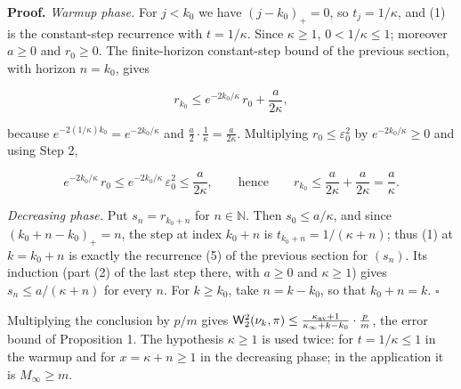 \documentclass[11pt,a4paper]{report}
\begin{document}
\textbf{Proof.} \emph{Warmup phase.} For \(j<k_0\) we have \((j-k_0)_+=0\), so \(t_j=1/\kappa\), and (1) is the constant-step recurrence with \(t=1/\kappa\). Since \(\kappa\ge1\), \(0<1/\kappa\le1\); moreover \(a\ge0\) and \(r_0\ge0\). The finite-horizon constant-step bound of the previous section, with horizon \(n=k_0\), gives


\[r_{k_0}\le e^{-2k_0/\kappa}\,r_0+\frac a{2\kappa},\]


because \(e^{-2(1/\kappa)k_0}=e^{-2k_0/\kappa}\) and \(\frac a2\cdot\frac1\kappa=\frac a{2\kappa}\). Multiplying \(r_0\le\varepsilon_0^2\) by \(e^{-2k_0/\kappa}\ge0\) and using Step 2,


\[e^{-2k_0/\kappa}\,r_0\le e^{-2k_0/\kappa}\,\varepsilon_0^2\le\frac a{2\kappa},\qquad\text{hence}\qquad r_{k_0}\le\frac a{2\kappa}+\frac a{2\kappa}=\frac a\kappa.\]


\emph{Decreasing phase.} Put \(s_n=r_{k_0+n}\) for \(n\in\mathbb N\). Then \(s_0\le a/\kappa\), and since \((k_0+n-k_0)_+=n\), the step at index \(k_0+n\) is \(t_{k_0+n}=1/(\kappa+n)\); thus (1) at \(k=k_0+n\) is exactly the recurrence (5) of the previous section for \((s_n)\). Its induction (part (2) of the last step there, with \(a\ge0\) and \(\kappa\ge1\)) gives \(s_n\le a/(\kappa+n)\) for every \(n\). For \(k\ge k_0\), take \(n=k-k_0\), so that \(k_0+n=k\). \(\square\)




Multiplying the conclusion by \(p/m\) gives \(\mathsf W_2^2(\nu_k,\pi)\le\frac{\kappa_{\rm av}+1}{\kappa_\infty+k-k_0}\cdot\frac pm\), the error bound of Proposition 1. The hypothesis \(\kappa\ge1\) is used twice: for \(t=1/\kappa\le1\) in the warmup and for \(x=\kappa+n\ge1\) in the decreasing phase; in the application it is \(M_\infty\ge m\).
\end{document}
